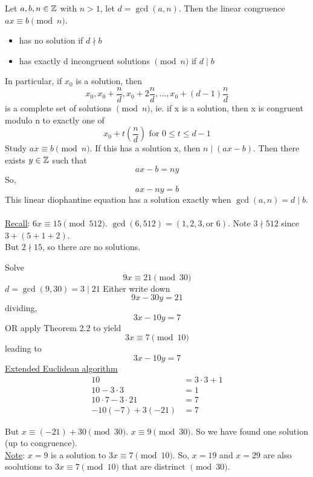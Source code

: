     \begin{theorem} 
        Let $a,b,n\in\mathbb{Z}$ with $n>1$, let $d=\gcd(a,n)$.
        Then the linear congruence $ax\equiv b\pmod{n}$. 
        \begin{itemize}
            \item has no solution if $d\nmid b$
            \item has exactly d incongruent solutions $\pmod{n}$ if $d\mid b$
        \end{itemize}
        In particular, if $x_0$ is a solution, then
        \[ 
            x_0, x_0+\frac{n}{d}, x_0+2\frac{n}{d},\dots, x_0+(d-1)\frac{n}{d}
        \]
        is a complete set of solutions $\pmod{n}$, ie. 
        if x is a solution, then x is congruent modulo n to exactly one of 
        \[
            x_0+t(\frac{n}{d}) \text{ for } 0\leq t\leq d-1
        \]
        Study $ax\equiv b\pmod{n}$. If this has a solution x, then
        $n\mid(ax-b)$. Then there exists $y\in\mathbb{Z}$ such that
        \[ ax-b=ny \]
        So, 
        \[ ax-ny=b \]
        This linear diophantine equation has a solution exactly when 
        $\gcd(a,n)=d\mid b$. \\\\
        \underline{Recall}: $6x\equiv 15\pmod{512}$.
        $\gcd(6,512)=(1,2,3,\text{or } 6)$. Note $3\nmid 512$ since 
        $3+(5+1+2)$. \\ But $2\nmid 15$, so there are no solutions.

        \begin{example}
            Solve \[ 9x\equiv 21\pmod{30} \]
            $d=\gcd(9,30)=3\mid 21$
            Either write down
            \[ 9x-30y=21 \]
            dividing,
            \[ 3x-10y=7 \]
            OR apply Theorem 2.2 to yield 
            \[ 3x\equiv 7\pmod{10} \] 
            leading to 
            \[ 3x-10y=7 \]
            \underline{Extended Euclidean algorithm}
            \begin{align*}
                10 &= 3\cdot 3+1 \\
                10-3\cdot 3 &= 1 \\
                10\cdot 7 - 3\cdot 21 &= 7 \\
                -10(-7)+3(-21) &= 7
            \end{align*}
            \begin{center}
            \end{center}
            But $x\equiv (-21)+30\pmod{30}$. $x\equiv 9\pmod{30}$. 
            So we have found one solution (up to congruence). \\
            \underline{Note}: $x=9$ is a solution to $3x\equiv 7\pmod{10}$. 
            So, $x=19$ and $x=29$ are also soolutions to $3x\equiv 7\pmod{10}$ 
            that are distrinct $\pmod{30}$.
        \end{example}


\end{theorem}
